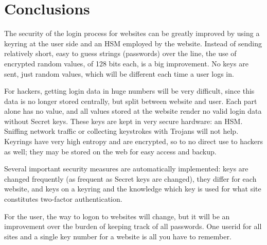 \section{Conclusions}
The security of the login process for websites can be greatly improved by using a keyring at the user side and an HSM employed by the website.
Instead of sending relatively short, easy to guess strings (passwords) over the line,
the use of encrypted random values,
of 128 bits each,
is a big improvement.
No keys are sent,
just random values,
which will be different each time a user logs in.
\par
For hackers,
getting login data in huge numbers will be very difficult,
since this data is no longer stored centrally,
but split between website and user.
Each part alone has no value,
and all values stored at the website render no valid login data without Secret keys.
These keys are kept in very secure hardware: an HSM.
Sniffing network traffic
or collecting keystrokes with Trojans will not help.
Keyrings have very high entropy and are encrypted,
so to no direct use to hackers as well;
they may be stored on the web for easy access and backup.
\par
Several important security measures are automatically implemented:
keys are changed frequently
(as frequent as Secret keys are changed),
they differ for each website,
and keys on a keyring and the knowledge which key is used for what site constitutes two-factor authentication.
\par
For the user,
the way to logon to websites will change,
but it will be an improvement over the burden of keeping track of all passwords.
One userid for all sites and a single key number for a website is all you have to remember.

